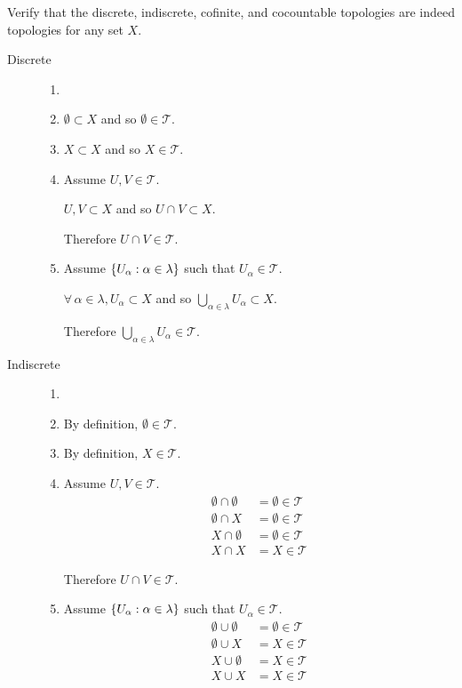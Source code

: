 \documentclass[letterpaper,12pt,fleqn]{article}
\newcommand{\T}{\mathscr{T}}
\renewcommand{\a}{\alpha}
\renewcommand{\l}{\lambda}
\begin{document}
\begin{example}[Exercise 2.5]
  Verify that the discrete, indiscrete, cofinite, and cocountable topologies are indeed topologies for any set \(X\).

  \begin{description}
  \item[Discrete]
    \begin{enumerate}
    \item[]
    \item \(\emptyset\subset X\) and so \(\emptyset\in\T\).

    \item \(X\subset X\) and so \(X\in\T\).

    \item Assume \(U,V\in\T\).

      \(U,V\subset X\) and so \(U\cap V\subset X\).

      Therefore \(U\cap V\in\T\).

    \item Assume \(\set{U_{\a}:\a\in\l}\) such that \(U_{\a}\in\T\).

      \(\forall\,\a\in\l,U_{\a}\subset X\) and so \(\bigcup_{\a\in\l}U_{\a}\subset X\).

      Therefore \(\bigcup_{\a\in\l}U_{\a}\in\T\).
    \end{enumerate}

  \item[Indiscrete]
    \begin{enumerate}
    \item[]
    \item By definition, \(\emptyset\in\T\).

    \item By definition, \(X\in\T\).

    \item Assume \(U,V\in\T\).
      \begin{align*}
        \emptyset\cap\emptyset &= \emptyset\in\T \\
        \emptyset\cap X &= \emptyset\in\T \\
        X\cap\emptyset &= \emptyset\in\T \\
        X\cap X &= X\in\T
      \end{align*}

      Therefore \(U\cap V\in\T\).

    \item Assume \(\set{U_{\a}:\a\in\l}\) such that \(U_{\a}\in\T\).
      \begin{align*}
        \emptyset\cup\emptyset &= \emptyset\in\T \\
        \emptyset\cup X &= X\in\T \\
        X\cup\emptyset &= X\in\T \\
        X\cup X &= X\in\T
      \end{align*}


\end{enumerate}
\end{description}
\end{example}
\end{document}
